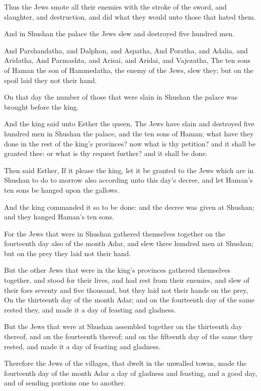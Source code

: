 \Verse Thus the Jews smote all their enemies with the stroke of the sword, and slaughter, and destruction, and did what they would unto those that hated them.

\Verse And in Shushan the palace the Jews slew and destroyed five hundred men.

\Verse And Parshandatha, and Dalphon, and Aspatha, \Verse And Poratha, and Adalia, and Aridatha, \Verse And Parmashta, and Arisai, and Aridai, and Vajezatha, \Verse The ten sons of Haman the son of Hammedatha, the enemy of the Jews, slew they; but on the spoil laid they not their hand.

\Verse On that day the number of those that were slain in Shushan the palace was brought before the king.

\Verse And the king said unto Esther the queen, The Jews have slain and destroyed five hundred men in Shushan the palace, and the ten sons of Haman; what have they done in the rest of the king's provinces? now what is thy petition? and it shall be granted thee: or what is thy request further? and it shall be done.

\Verse Then said Esther, If it please the king, let it be granted to the Jews which are in Shushan to do to morrow also according unto this day's decree, and let Haman's ten sons be hanged upon the gallows.

\Verse And the king commanded it so to be done: and the decree was given at Shushan; and they hanged Haman's ten sons.

\Verse For the Jews that were in Shushan gathered themselves together on the fourteenth day also of the month Adar, and slew three hundred men at Shushan; but on the prey they laid not their hand.

\Verse But the other Jews that were in the king's provinces gathered themselves together, and stood for their lives, and had rest from their enemies, and slew of their foes seventy and five thousand, but they laid not their hands on the prey, \Verse On the thirteenth day of the month Adar; and on the fourteenth day of the same rested they, and made it a day of feasting and gladness.

\Verse But the Jews that were at Shushan assembled together on the thirteenth day thereof, and on the fourteenth thereof; and on the fifteenth day of the same they rested, and made it a day of feasting and gladness.

\Verse Therefore the Jews of the villages, that dwelt in the unwalled towns, made the fourteenth day of the month Adar a day of gladness and feasting, and a good day, and of sending portions one to another.

